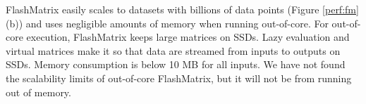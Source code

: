 
FlashMatrix easily scales to datasets with billions of data points
(Figure \ref{perf:fm}(b)) and uses negligible amounts of memory when running out-of-core.
For out-of-core execution, FlashMatrix keeps large matrices on
SSDs.  %
Lazy evaluation and virtual matrices make it so that data are streamed from inputs to outputs
  on SSDs.  Memory consumption is below 10 MB for all inputs.
We have not found the scalability limits of out-of-core FlashMatrix, but it will not be 
from running out of memory.

